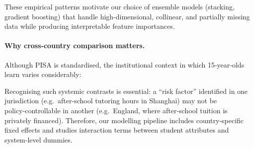 \documentclass[final,5p,times,twocolumn,authoryear]{elsarticle}
\begin{document}
These empirical patterns motivate our choice of ensemble models (stacking, gradient boosting) that handle high‑dimensional, collinear, and partially missing data while producing interpretable feature importances.

\paragraph{Why cross‑country comparison matters.}
Although PISA is standardised, the institutional context in which 15‑year‑olds learn varies considerably:


Recognising such systemic contrasts is essential: a “risk factor” identified in one jurisdiction (e.g.\ after‑school tutoring hours in Shanghai) may not be policy‑controllable in another (e.g.\ England, where after‑school tuition is privately financed).  Therefore, our modelling pipeline includes country‑specific fixed effects and studies interaction terms between student attributes and system‑level dummies.
\end{document}
